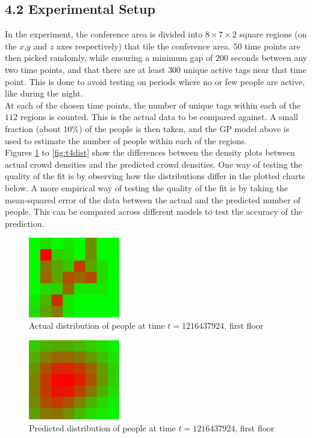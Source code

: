 \documentclass[letterpaper]{article}
\begin{document}
\subsection{4.2  Experimental Setup}

In the experiment, the conference area is divided into $8\times 7 \times 2$ square regions (on the $x$,$y$ and $z$ axes respectively) that tile the conference area. $50$ time points are then picked randomly, while ensuring a minimum gap of $200$ seconds between any two time points, and that there are at least $300$ unique active tags near that time point. This is done to avoid testing on periods where no or few people are active, like during the night.\\

At each of the chosen time points, the number of unique tags within each of the $112$ regions is counted. This is the actual data to be compared against. A small fraction (about $10\%$) of the people is then taken, and the GP model above is used to estimate the number of people within each of the regions. \\

Figures \ref{fig:t1dist} to \ref{fig:t4dist} show the differences between the density plots between actual crowd densities and the predicted crowd densities. One way of testing the quality of the fit is by observing how the distributions differ in the plotted charts below. A more empirical way of testing the quality of the fit is by taking the mean-squared error of the data between the actual and the predicted number of people. This can be compared across different models to test the accuracy of the prediction.

\begin{figure}[h!]
  \centering
    \includegraphics[width=150px,natwidth=320,natheight=280]{selected_renders/0_1216437924.png}
  \caption{Actual distribution of people at time $t=1216437924$, first floor}
  \label{fig:t1dist}
\end{figure}

\begin{figure}[h!]
  \centering
    \includegraphics[width=150px,natwidth=320,natheight=280]{selected_renders/0_1216437924p.png}
  \caption{Predicted distribution of people at time $t=1216437924$, first floor}
  \label{fig:t2dist}
\end{figure}
\end{document}
